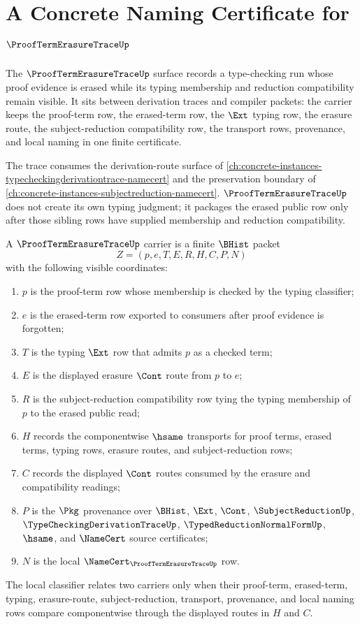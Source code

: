 \chapter{A Concrete Naming Certificate for $\ProofTermErasureTraceUp$}
\label{ch:concrete-instances-prooftermerasuretrace-namecert}

The $\ProofTermErasureTraceUp$ surface records a type-checking run whose proof evidence is erased while its typing membership and reduction compatibility remain visible. It sits between derivation traces and compiler packets: the carrier keeps the proof-term row, the erased-term row, the $\Ext$ typing row, the erasure route, the subject-reduction compatibility row, the transport rows, provenance, and local naming in one finite certificate.

The trace consumes the derivation-route surface of \autoref{ch:concrete-instances-typecheckingderivationtrace-namecert} and the preservation boundary of \autoref{ch:concrete-instances-subjectreduction-namecert}. $\ProofTermErasureTraceUp$ does not create its own typing judgment; it packages the erased public row only after those sibling rows have supplied membership and reduction compatibility.

\begin{definition}
\label{def:proofterm-erasure-trace-carrier}
A $\ProofTermErasureTraceUp$ carrier is a finite $\BHist$ packet
$$
Z=(p,e,T,E,R,H,C,P,N)
$$
with the following visible coordinates:
\begin{enumerate}
\item $p$ is the proof-term row whose membership is checked by the typing classifier;
\item $e$ is the erased-term row exported to consumers after proof evidence is forgotten;
\item $T$ is the typing $\Ext$ row that admits $p$ as a checked term;
\item $E$ is the displayed erasure $\Cont$ route from $p$ to $e$;
\item $R$ is the subject-reduction compatibility row tying the typing membership of $p$ to the erased public read;
\item $H$ records the componentwise $\hsame$ transports for proof terms, erased terms, typing rows, erasure routes, and subject-reduction rows;
\item $C$ records the displayed $\Cont$ routes consumed by the erasure and compatibility readings;
\item $P$ is the $\Pkg$ provenance over $\BHist$, $\Ext$, $\Cont$, $\SubjectReductionUp$, $\TypeCheckingDerivationTraceUp$, $\TypedReductionNormalFormUp$, $\hsame$, and $\NameCert$ source certificates;
\item $N$ is the local $\NameCert_{\ProofTermErasureTraceUp}$ row.
\end{enumerate}
The local classifier relates two carriers only when their proof-term, erased-term, typing, erasure-route, subject-reduction, transport, provenance, and local naming rows compare componentwise through the displayed routes in $H$ and $C$.
\end{definition}

